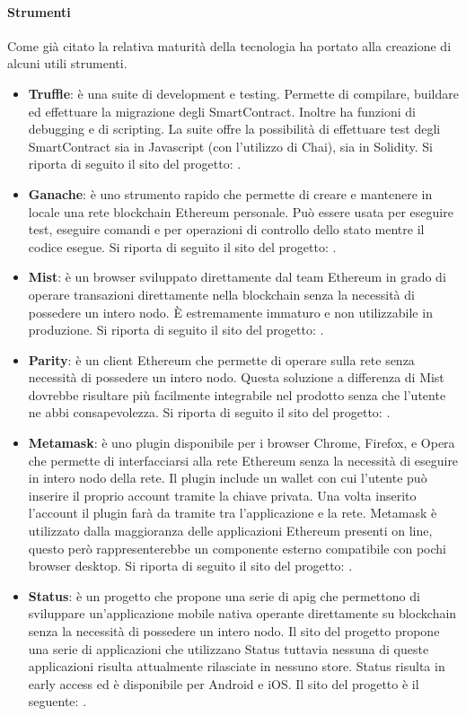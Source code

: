 \paragraph{Strumenti}
Come già citato la relativa maturità della tecnologia ha portato alla creazione di alcuni utili strumenti. 
\begin{itemize}
    \item \textbf{Truffle}: è una suite di development e testing. Permette di compilare, buildare ed effettuare la migrazione degli SmartContract. Inoltre ha funzioni di debugging e di scripting. La suite offre la possibilità di effettuare test degli SmartContract sia in Javascript (con l’utilizzo di Chai), sia in Solidity. Si riporta di seguito il sito del progetto: \cite{site:truffle}.
    \item \textbf{Ganache}: è uno strumento rapido che permette di creare e mantenere in locale una rete blockchain Ethereum personale. Può essere usata per eseguire test, eseguire comandi e per operazioni di controllo dello stato mentre il codice esegue. Si riporta di seguito il sito del progetto: \cite{site:ganache}.
    \item \textbf{Mist}: è un browser sviluppato direttamente dal team Ethereum in grado di operare transazioni direttamente nella blockchain senza la necessità di possedere un intero nodo. È estremamente immaturo e non utilizzabile in produzione. Si riporta di seguito il sito del progetto: \cite{site:mist}.
    \item \textbf{Parity}: è un client Ethereum che permette di operare sulla rete senza necessità di possedere un intero nodo. Questa soluzione a differenza di Mist dovrebbe risultare più facilmente integrabile nel prodotto senza che l’utente ne abbi consapevolezza. Si riporta di seguito il sito del progetto: \cite{site:parity} .
    \item \textbf{Metamask}: è uno plugin disponibile per i browser Chrome, Firefox, e Opera che permette di interfacciarsi alla rete Ethereum senza la necessità di eseguire in intero nodo della rete. Il plugin include un wallet con cui l’utente può inserire il proprio account tramite la chiave privata. Una volta inserito l’account il plugin farà da tramite tra l’applicazione e la rete.
    Metamask è utilizzato dalla maggioranza delle applicazioni Ethereum presenti on line, questo però rappresenterebbe un componente esterno compatibile con pochi browser desktop. Si riporta di seguito il sito del progetto: \cite{site:metamask} .
    \item \textbf{Status}: è un progetto che propone una serie di \gls{apig} che permettono di sviluppare un’applicazione mobile nativa operante direttamente su blockchain senza la necessità di possedere un intero nodo. Il sito del progetto propone una serie di applicazioni che utilizzano Status tuttavia nessuna di queste applicazioni risulta attualmente rilasciate in nessuno store. Status risulta in early access ed è disponibile per Android e iOS. Il sito del progetto è il seguente: \cite{site:status}.

\end{itemize}
